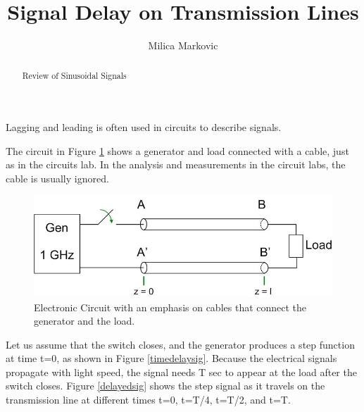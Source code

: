 \documentclass{ximera}
\title{Signal Delay on Transmission Lines}
\author{Milica Markovic}
\begin{document}
  
\begin{abstract}  
Review of Sinusoidal Signals
\end{abstract}  
\maketitle




Lagging and leading is often used in circuits to describe signals.

The circuit in Figure \ref{elcric} shows a generator and load connected with a cable, just as in the circuits lab. In the analysis and measurements in the circuit labs, the cable is usually ignored. 



\begin{figure}[htbp]
\begin{center}
\includegraphics[scale=0.5]{../jpg/generaltransmissionlinecircuit1.jpg}
\end{center}
\caption{Electronic Circuit with an emphasis on cables that connect the generator and the load.}
\label{elcric}
\end{figure}

Let us assume that the switch closes, and the generator produces a step function at time t=0, as shown in Figure  \ref{timedelaysig}. Because the electrical signals propagate with light speed, the signal needs T sec to appear at the load after the switch closes. Figure \ref{delayedsig} shows the step signal as it travels on the transmission line at different times t=0, t=T/4, t=T/2, and t=T.
\end{document}
